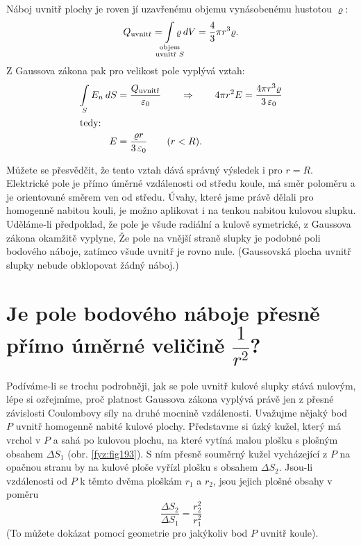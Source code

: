 {  Náboj uvnitř plochy je roven jí uzavřenému objemu vynásobenému hustotou \(\varrho\):
  \begin{equation}\label{fyz:eq_fey_elstat_gauss05} 
    Q_{\text{uvnitř}} 
            = \limitint_{\mathclap{\substack{\text{objem}\\
                                             \text{uvnitř }S}}} \varrho\dd{V} 
            = \frac{4}{3}\pi r^3\varrho.           
  \end{equation}
  Z Gaussova zákona pak pro velikost pole vyplývá vztah:
  \begin{align}      
   \mathop{\int}_S E_n\hspace{2pt}dS
      &= \frac{Q_{\text{uvnitř}}}{\varepsilon_0} 
            \qquad\Rightarrow\qquad 4\pi r^2E 
            = \frac{4\pi r^3\varrho}{3\,\varepsilon_0}  \label{fyz:eq_fey_elstat_gauss06} \\ 
   \shortintertext{tedy:}
   E  &= \frac{\varrho r}{3\,\varepsilon_0} \qquad (r<R).
  \end{align}
  
  Můžete se přesvědčit, že tento vztah dává správný výsledek i pro \(r=R\). Elektrické pole je 
  přímo úměrné vzdálenosti od středu koule, má směr poloměru a je orientované směrem ven od 
  středu. Úvahy, které jsme právě dělali pro homogenně nabitou kouli, je možno aplikovat i na 
  tenkou nabitou kulovou slupku. Uděláme-li předpoklad, že pole je všude radiální a kulově 
  symetrické, z Gaussova zákona okamžitě vyplyne, Že pole na vnější straně slupky je podobné 
  poli bodového náboje, zatímco všude uvnitř je rovno nule. (Gaussovská plocha uvnitř slupky 
  nebude obklopovat žádný náboj.)
  
\section{Je pole bodového náboje přesně přímo úměrné veličině 
             \texorpdfstring{\fontsize{8pt}{9pt}\selectfont\(\dfrac{1}{r^2}\)}{1/r^2}?}\label{fyz:IIchapVsecVII}
              
  Podíváme-li se trochu podrobněji, jak se pole uvnitř kulové slupky stává nulovým, lépe si 
  ozřejmíme, proč platnost Gaussova zákona vyplývá právě jen z přesné závislosti Coulombovy 
  síly na druhé mocnině vzdálenosti. Uvažujme nějaký bod \(P\) uvnitř homogenně nabité kulové 
  plochy. Představme si úzký kužel, který má vrchol v \(P\) a sahá po kulovou plochu, na které 
  vytíná malou plošku s plošným obsahem \(\Delta S_1\) (obr. \ref{fyz:fig193}). 
  S ním přesně souměrný kužel vycházející z \(P\) na opačnou stranu by na kulové ploše vyřízl 
  plošku s obsahem \(\Delta S_2\). Jsou-li vzdálenosti od \(P\) k těmto dvěma ploškám \(r_1\) a 
  \(r_2\), jsou jejich plošné obsahy v poměru \[\frac{\Delta S_2}{\Delta S_1} = 
  \frac{r_2^2}{r_1^2}\] (To můžete dokázat pomocí geometrie pro jakýkoliv bod \(P\) uvnitř 
  koule).

}
